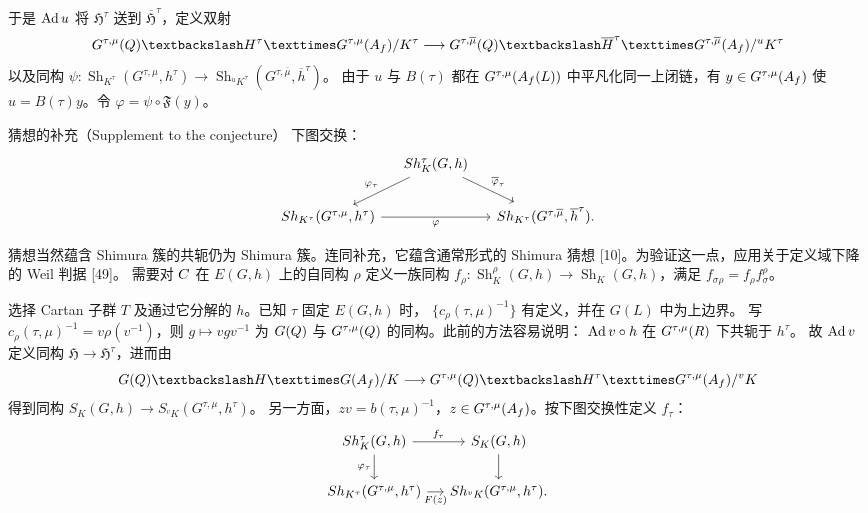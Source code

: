 于是 $\Ad u$ 将 $\mathfrak H^\tau$ 送到 $\overline{\mathfrak H}^{\tau}$，定义双射
\[
G^{\tau,\mu}(\Q)\backslash\mathfrak H^\tau\times G^{\tau,\mu}(\A_f)/K^\tau
\longrightarrow
G^{\tau,\overline\mu}(\Q)\backslash\overline{\mathfrak H}^\tau
\times G^{\tau,\overline\mu}(\A_f)/{}^uK^\tau
\]
以及同构
$\psi:\operatorname{Sh}_{K^\tau}(G^{\tau,\mu},h^\tau)
\to\operatorname{Sh}_{{}^uK^\tau}(G^{\tau,\overline\mu},\overline h^\tau)$。
由于 $u$ 与 $B(\tau)$ 都在 $G^{\tau,\mu}(A_f(L))$ 中平凡化同一上闭链，有
$y\in G^{\tau,\mu}(A_f)$ 使 $u=B(\tau)y$。令 $\varphi=\psi\circ\mathfrak F(y)$。

\begin{originaltheorem}{猜想的补充（Supplement to the conjecture）}
下图交换：
\[
\begin{tikzcd}[column sep=small]
&\operatorname{Sh}_K^\tau(G,h)\arrow[dl,"\varphi_\tau"']\arrow[dr,"\overline\varphi_\tau"]&\\
\operatorname{Sh}_{K^\tau}(G^{\tau,\mu},h^\tau)\arrow[rr,"\varphi"']&&
\operatorname{Sh}_{K^\tau}(G^{\tau,\overline\mu},\overline h^\tau).
\end{tikzcd}
\]
\end{originaltheorem}

猜想当然蕴含 Shimura 簇的共轭仍为 Shimura 簇。连同补充，它蕴含通常形式的
Shimura 猜想 [10]。为验证这一点，应用关于定义域下降的 Weil 判据 [49]。
需要对 $C$ 在 $E(G,h)$ 上的自同构 $\rho$ 定义一族同构
$f_\rho:\operatorname{Sh}_K^\rho(G,h)\to\operatorname{Sh}_K(G,h)$，满足
$f_{\sigma\rho}=f_\rho f_\sigma^\rho$。

选择 Cartan 子群 $T$ 及通过它分解的 $h$。已知 $\tau$ 固定 $E(G,h)$ 时，
$\{c_\rho(\tau,\mu)^{-1}\}$ 有定义，并在 $G(L)$ 中为上边界。
写 $c_\rho(\tau,\mu)^{-1}=v\rho(v^{-1})$，则
$g\mapsto vgv^{-1}$ 为 $G(Q)$ 与 $G^{\tau,\mu}(Q)$ 的同构。此前的方法容易说明：
$\Ad v\circ h$ 在 $G^{\tau,\mu}(R)$ 下共轭于 $h^\tau$。
故 $\Ad v$ 定义同构 $\mathfrak H\to\mathfrak H^\tau$，进而由
\[
G(\Q)\backslash\mathfrak H\times G(\A_f)/K
\longrightarrow G^{\tau,\mu}(\Q)\backslash\mathfrak H^\tau
\times G^{\tau,\mu}(\A_f)/{}^vK
\]
得到同构 $S_K(G,h)\to S_{{}^vK}(G^{\tau,\mu},h^\tau)$。
另一方面，$zv=b(\tau,\mu)^{-1}$，$z\in G^{\tau,\mu}(A_f)$。按下图交换性定义 $f_\tau$：
\[
\begin{tikzcd}[column sep=small]
\operatorname{Sh}_K^\tau(G,h)\arrow[r,"f_\tau"]\arrow[d,"\varphi_\tau"']&S_K(G,h)\arrow[d]\\
\operatorname{Sh}_{K^\tau}(G^{\tau,\mu},h^\tau)\arrow[r,"\mathfrak F(z)"']&
\operatorname{Sh}_{{}^vK}(G^{\tau,\mu},h^\tau).
\end{tikzcd}
\]

